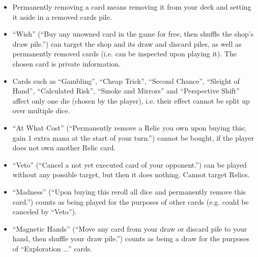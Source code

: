 \documentclass[dvipsnames,parskip,a4paper]{scrartcl}
\begin{document}
\begin{itemize}
\item Permanently removing a card means removing it from your deck and setting it aside in a removed cards pile.
\item ``Wish'' (``Buy any unowned card in the game for free, then shuffle the shop's draw pile.'') can target the shop and its draw and discard piles, as well as permanently removed cards (i.e. can be inspected upon playing it). The chosen card is private information.
\item Cards such as ``Gambling'', ``Cheap Trick'', ``Second Chance'', ``Sleight of Hand'', ``Calculated Risk'', ``Smoke and Mirrors'' and ``Perspective Shift'' affect only one die (chosen by the player), i.e. their effect cannot be split up over multiple dice.
\item ``At What Cost'' (``Permanently remove a Relic you own upon buying this; gain 1 extra mana at the start of your turn.'') cannot be bought, if the player does not own another Relic card.
\item ``Veto'' (``Cancel a not yet executed card of your opponent.'') can be played without any possible target, but then it does nothing. Cannot target Relics.
\item ``Madness'' (``Upon buying this reroll all dice and permanently remove this card.'') counts as being played for the purposes of other cards (e.g. could be canceled by ``Veto''). 
\item ``Magnetic Hands'' (``Move any card from your draw or discard pile to your hand, then shuffle your draw pile.'') counts as being a draw for the purposes of ``Exploration ...'' cards.
\end{itemize}

\newpage
\end{document}
